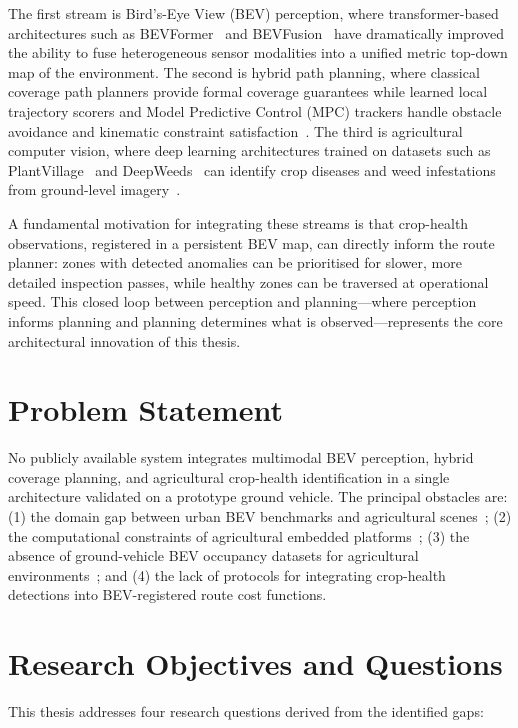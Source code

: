 \documentclass[12pt, a4paper]{article}
\begin{document}
The first stream is Bird's-Eye View (BEV) perception, where transformer-based architectures
such as BEVFormer~\cite{ref48, ref49} and BEVFusion~\cite{ref13, ref18} have dramatically
improved the ability to fuse heterogeneous sensor modalities into a unified metric top-down
map of the environment. The second is hybrid path planning, where classical coverage path
planners provide formal coverage guarantees while learned local trajectory scorers and
Model Predictive Control (MPC) trackers handle obstacle avoidance and kinematic constraint
satisfaction~\cite{ref103, ref105, ref118}. The third is agricultural computer vision, where
deep learning architectures trained on datasets such as PlantVillage~\cite{ref157, ref159}
and DeepWeeds~\cite{ref167, ref168} can identify crop diseases and weed infestations from
ground-level imagery~\cite{ref149, ref150, ref154}.

A fundamental motivation for integrating these streams is that crop-health observations,
registered in a persistent BEV map, can directly inform the route planner: zones with
detected anomalies can be prioritised for slower, more detailed inspection passes, while
healthy zones can be traversed at operational speed. This closed loop between perception
and planning---where perception informs planning and planning determines what is
observed---represents the core architectural innovation of this thesis.

\section{Problem Statement}

No publicly available system integrates multimodal BEV perception, hybrid coverage
planning, and agricultural crop-health identification in a single architecture validated on
a prototype ground vehicle. The principal obstacles are: (1) the domain gap between urban
BEV benchmarks and agricultural scenes~\cite{ref2, ref32, ref35}; (2) the computational
constraints of agricultural embedded platforms~\cite{ref1}; (3) the absence of
ground-vehicle BEV occupancy datasets for agricultural environments~\cite{ref40}; and
(4) the lack of protocols for integrating crop-health detections into BEV-registered route
cost functions.

\section{Research Objectives and Questions}

This thesis addresses four research questions derived from the identified gaps:
\end{document}
